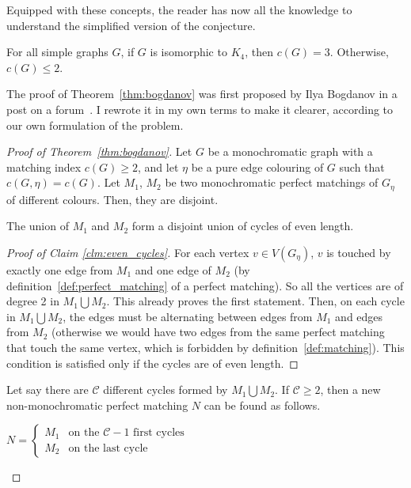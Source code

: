 Equipped with these concepts, the reader has now all the knowledge to understand the simplified version of the conjecture.

\begin{theorem}
    \label{thm:bogdanov}
    For all simple graphs $G$, if $G$ is isomorphic to $K_4$, then $c(G) = 3$.
    Otherwise, $c(G) \leq 2$.
\end{theorem}

The proof of Theorem~\ref{thm:bogdanov} was first proposed by Ilya Bogdanov in a post on a forum~\cite{bogdanov}.
I rewrote it in my own terms to make it clearer, according to our own formulation of the problem.

\begin{proof}[Proof of Theorem~\ref{thm:bogdanov}]
    Let $G$ be a monochromatic graph with a matching index $c(G) \geq 2$, and let $\eta$ be a pure edge colouring of $G$ such that $c(G, \eta) = c(G)$.
    Let $M_1$, $M_2$ be two monochromatic perfect matchings of $G_\eta$ of different colours.
    Then, they are disjoint.
    
    \begin{claim}
        \label{clm:even_cycles}
        The union of $M_1$ and $M_2$ form a disjoint union of cycles of even length.
    \end{claim}
    
    \begin{proof}[Proof of Claim \ref{clm:even_cycles}]
        For each vertex $v \in V(G_\eta)$, $v$ is touched by exactly one edge from $M_1$ and one edge of $M_2$ (by definition~\ref{def:perfect_matching} of a perfect matching).
        So all the vertices are of degree 2 in $M_1 \bigcup M_2$.
        This already proves the first statement.
        Then, on each cycle in $M_1 \bigcup M_2$, the edges must be alternating between edges from $M_1$ and edges from $M_2$ (otherwise we would have two edges from the same perfect matching that touch the same vertex, which is forbidden by definition~\ref{def:matching}).
        This condition is satisfied only if the cycles are of even length.
    \end{proof}
    
    Let say there are $\mathcal{C}$ different cycles formed by $M_1 \bigcup M_2$.
    If $\mathcal{C} \geq 2$, then a new non-monochromatic perfect matching $N$ can be found as follows.
    
    \begin{center}
        $N = \left\{
        \begin{array}{ll}
            M_1 & \mbox{on the } \mathcal{C} - 1 \mbox{ first cycles} \\
            M_2 & \mbox{on the last cycle}
        \end{array}
        \right.$
    \end{center}


\end{proof}

